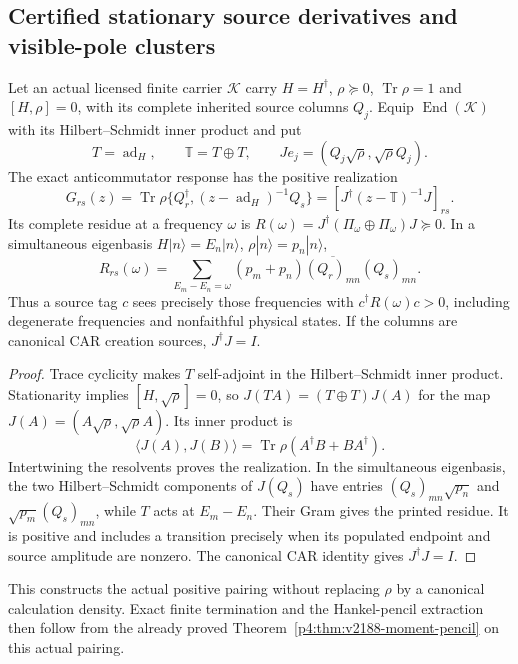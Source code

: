 \documentclass[12pt,a4paper]{article}
\begin{document}
\subsection{Certified stationary source derivatives and visible-pole clusters}
\label{p4:sec:v249-certified-source-poles}
\begin{theorem}
\label{p4:thm:v249-source-hs-realization}
Let an actual licensed finite carrier $\mathcal K$ carry
$H=H^\dagger$, $\rho\succeq0$, $\operatorname{Tr}\rho=1$ and
$[H,\rho]=0$, with its complete inherited source columns $Q_j$.
Equip $\operatorname{End}(\mathcal K)$ with its Hilbert--Schmidt
inner product and put
\[
 T=\operatorname{ad}_H,\qquad \mathbb T=T\oplus T,\qquad
 Je_j=(Q_j\sqrt\rho,\sqrt\rho Q_j).
\]
The exact anticommutator response has the positive realization
\[
 \boxed{G_{rs}(z)=\operatorname{Tr}\rho
 \{Q_r^\dagger,(z-\operatorname{ad}_H)^{-1}Q_s\}
 =[J^\dagger(z-\mathbb T)^{-1}J]_{rs}.}
\]
Its complete residue at a frequency $\omega$ is
$R(\omega)=J^\dagger(\Pi_\omega\oplus\Pi_\omega)J\succeq0$.
In a simultaneous eigenbasis $H|n\rangle=E_n|n\rangle$,
$\rho|n\rangle=p_n|n\rangle$,
\[
 \boxed{R_{rs}(\omega)=
 \sum_{E_m-E_n=\omega}(p_m+p_n)
 \overline{(Q_r)_{mn}}(Q_s)_{mn}.}
\]
Thus a source tag $c$ sees precisely those frequencies with
$c^\dagger R(\omega)c>0$, including degenerate frequencies and
nonfaithful physical states. If the columns are canonical CAR
creation sources, $J^\dagger J=I$.
\end{theorem}
\begin{proof}
Trace cyclicity makes $T$ self-adjoint in the Hilbert--Schmidt
inner product. Stationarity implies $[H,\sqrt\rho]=0$, so
$J(TA)=(T\oplus T)J(A)$ for the map
$J(A)=(A\sqrt\rho,\sqrt\rho A)$. Its inner product is
\[
 \langle J(A),J(B)\rangle
 =\operatorname{Tr}\rho(A^\dagger B+BA^\dagger).
\]
Intertwining the resolvents proves the realization. In the simultaneous
eigenbasis, the two Hilbert--Schmidt components of $J(Q_s)$ have
entries $(Q_s)_{mn}\sqrt{p_n}$ and
$\sqrt{p_m}(Q_s)_{mn}$, while $T$ acts at $E_m-E_n$.
Their Gram gives the printed residue. It is positive and includes a
transition precisely when its populated endpoint and source amplitude
are nonzero. The canonical CAR identity gives $J^\dagger J=I$.
\end{proof}
This constructs the actual positive pairing without replacing $\rho$
by a canonical calculation density. Exact finite termination and the
Hankel-pencil extraction then follow from the already proved
Theorem~\ref{p4:thm:v2188-moment-pencil} on this actual pairing.
\end{document}
